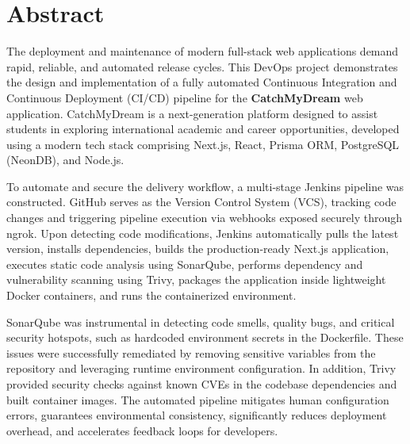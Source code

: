 \documentclass[12pt,a4paper]{article}
\begin{document}
\section*{Abstract}

The deployment and maintenance of modern full-stack web applications demand rapid, reliable, and automated release cycles. This DevOps project demonstrates the design and implementation of a fully automated Continuous Integration and Continuous Deployment (CI/CD) pipeline for the \textbf{CatchMyDream} web application. CatchMyDream is a next-generation platform designed to assist students in exploring international academic and career opportunities, developed using a modern tech stack comprising Next.js, React, Prisma ORM, PostgreSQL (NeonDB), and Node.js. 

To automate and secure the delivery workflow, a multi-stage Jenkins pipeline was constructed. GitHub serves as the Version Control System (VCS), tracking code changes and triggering pipeline execution via webhooks exposed securely through ngrok. Upon detecting code modifications, Jenkins automatically pulls the latest version, installs dependencies, builds the production-ready Next.js application, executes static code analysis using SonarQube, performs dependency and vulnerability scanning using Trivy, packages the application inside lightweight Docker containers, and runs the containerized environment. 

SonarQube was instrumental in detecting code smells, quality bugs, and critical security hotspots, such as hardcoded environment secrets in the Dockerfile. These issues were successfully remediated by removing sensitive variables from the repository and leveraging runtime environment configuration. In addition, Trivy provided security checks against known CVEs in the codebase dependencies and built container images. The automated pipeline mitigates human configuration errors, guarantees environmental consistency, significantly reduces deployment overhead, and accelerates feedback loops for developers.

\clearpage

\tableofcontents
\clearpage
\end{document}
